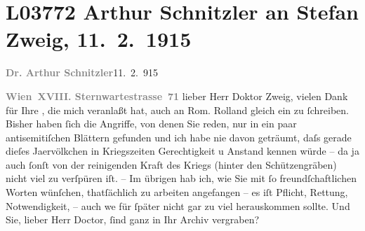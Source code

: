 

\section[Arthur Schnitzler an Stefan Zweig, 11. 2. 1915]{L03772 Arthur Schnitzler an Stefan Zweig, 11. 2. 1915}
\nopagebreak{}
\rehead{ }\normalsize\beginnumbering{}
\toendnotes[C]{\smallbreak\pagebreak[2]}
\toendnotes[C]{\smallbreak}
\pstart
           {\pb}\textcolor{gray}{\textbf{Dr. Arthur Schnitzler}}\hfill 11. 2. 915\pend
           
\pstart
           \textcolor{gray}{\textbf{Wien XVIII. Sternwartestrasse 71}}\pend
           \vspace{0.5em}
\pstart
           lieber Herr Doktor Zweig, vielen Dank für Ihre \label{K_L03772-1v}\label{K_L03772-1}, die mich veranlaßt hat, auch an Rom.
                  Rolland gleich ein \label{K_L03772-2v}\label{K_L03772-2} zu ſchreiben. Bisher haben ſich die Angriffe,
               von denen Sie reden, nur in ein paar antisemitiſchen Blättern gefunden und ich habe
               nie davon geträumt, daſs gerade dieſes Ja{\geminationm}ervölkchen in Kriegszeiten Gerechtigkeit u
               Anstand {\pb}kennen würde – da ja auch ſonſt von der
               reinigenden Kraft des Kriegs (hinter den Schützengräben) nicht viel zu verſpüren iſt.
               – Im übrigen hab ich, wie Sie mit ſo freundſchaftlichen Worten wünſchen, thatſächlich
               zu arbeiten angefangen – es iſt Pflicht, Rettung, Notwendigkeit, – auch we{\geminationn} für
               ſpäter nicht gar zu viel herauskommen sollte. Und Sie, lieber Herr Doctor, ſind ganz
               in Ihr Archiv vergraben?\pend
           
